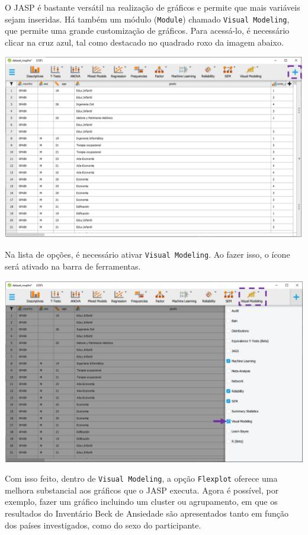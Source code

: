 \documentclass[
]{book}
\begin{document}
O JASP é bastante versátil na realização de gráficos e permite que mais
variáveis sejam inseridas. Há também um módulo (\texttt{Module}) chamado
\texttt{Visual\ Modeling}, que permite uma grande customização de
gráficos. Para acessá-lo, é necessário clicar na cruz azul, tal como
destacado no quadrado roxo da imagem abaixo.

\includegraphics{./img/cap_desc_jasp_modules.png}

Na lista de opções, é necessário ativar \texttt{Visual\ Modeling}. Ao
fazer isso, o ícone será ativado na barra de ferramentas.

\includegraphics{./img/cap_desc_jasp_visual_modeling.png}

Com isso feito, dentro de \texttt{Visual\ Modeling}, a opção
\texttt{Flexplot} oferece uma melhora substancial aos gráficos que o
JASP executa. Agora é possível, por exemplo, fazer um gráfico incluindo
um cluster ou agrupamento, em que os resultados do Inventário Beck de
Ansiedade são apresentados tanto em função dos países investigados, como
do sexo do participante.
\end{document}
